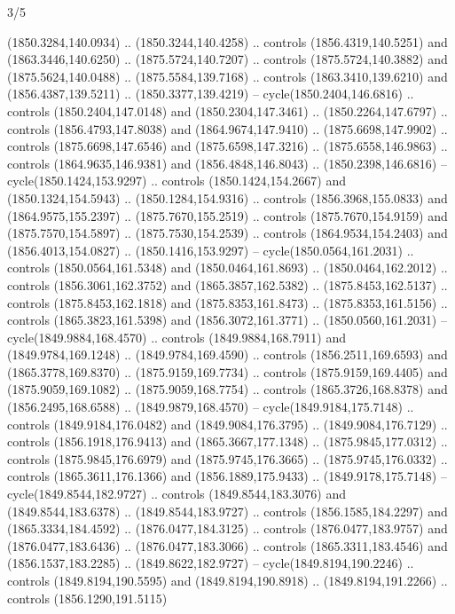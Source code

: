 \begin{flagdescription}{3/5}
\begin{scope}[xshift=0.5\flaglength,yshift=0.5\flagwidth,scale=\flagwidth/99]
\begin{scope}[y=0.8pt, x=0.8pt, yscale=-0.20628, xscale=0.20628,shift={(-500,-300)}]
\begin{scope}[cm={{0.79646,0.0,0.0,0.7753,(100.0721,273.79617)}}]
\begin{scope}[cm={{1.1028,0.0,0.0,1.08434,(-41.46868,-11.26981)}}]
  (1850.3284,140.0934) .. (1850.3244,140.4258) .. controls (1856.4319,140.5251)
  and (1863.3446,140.6250) .. (1875.5724,140.7207) .. controls
  (1875.5724,140.3882) and (1875.5624,140.0488) .. (1875.5584,139.7168) ..
  controls (1863.3410,139.6210) and (1856.4387,139.5211) .. (1850.3377,139.4219)
  -- cycle(1850.2404,146.6816) .. controls (1850.2404,147.0148) and
  (1850.2304,147.3461) .. (1850.2264,147.6797) .. controls (1856.4793,147.8038)
  and (1864.9674,147.9410) .. (1875.6698,147.9902) .. controls
  (1875.6698,147.6546) and (1875.6598,147.3216) .. (1875.6558,146.9863) ..
  controls (1864.9635,146.9381) and (1856.4848,146.8043) .. (1850.2398,146.6816)
  -- cycle(1850.1424,153.9297) .. controls (1850.1424,154.2667) and
  (1850.1324,154.5943) .. (1850.1284,154.9316) .. controls (1856.3968,155.0833)
  and (1864.9575,155.2397) .. (1875.7670,155.2519) .. controls
  (1875.7670,154.9159) and (1875.7570,154.5897) .. (1875.7530,154.2539) ..
  controls (1864.9534,154.2403) and (1856.4013,154.0827) .. (1850.1416,153.9297)
  -- cycle(1850.0564,161.2031) .. controls (1850.0564,161.5348) and
  (1850.0464,161.8693) .. (1850.0464,162.2012) .. controls (1856.3061,162.3752)
  and (1865.3857,162.5382) .. (1875.8453,162.5137) .. controls
  (1875.8453,162.1818) and (1875.8353,161.8473) .. (1875.8353,161.5156) ..
  controls (1865.3823,161.5398) and (1856.3072,161.3771) .. (1850.0560,161.2031)
  -- cycle(1849.9884,168.4570) .. controls (1849.9884,168.7911) and
  (1849.9784,169.1248) .. (1849.9784,169.4590) .. controls (1856.2511,169.6593)
  and (1865.3778,169.8370) .. (1875.9159,169.7734) .. controls
  (1875.9159,169.4405) and (1875.9059,169.1082) .. (1875.9059,168.7754) ..
  controls (1865.3726,168.8378) and (1856.2495,168.6588) .. (1849.9879,168.4570)
  -- cycle(1849.9184,175.7148) .. controls (1849.9184,176.0482) and
  (1849.9084,176.3795) .. (1849.9084,176.7129) .. controls (1856.1918,176.9413)
  and (1865.3667,177.1348) .. (1875.9845,177.0312) .. controls
  (1875.9845,176.6979) and (1875.9745,176.3665) .. (1875.9745,176.0332) ..
  controls (1865.3611,176.1366) and (1856.1889,175.9433) .. (1849.9178,175.7148)
  -- cycle(1849.8544,182.9727) .. controls (1849.8544,183.3076) and
  (1849.8544,183.6378) .. (1849.8544,183.9727) .. controls (1856.1585,184.2297)
  and (1865.3334,184.4592) .. (1876.0477,184.3125) .. controls
  (1876.0477,183.9757) and (1876.0477,183.6436) .. (1876.0477,183.3066) ..
  controls (1865.3311,183.4546) and (1856.1537,183.2285) .. (1849.8622,182.9727)
  -- cycle(1849.8194,190.2246) .. controls (1849.8194,190.5595) and
  (1849.8194,190.8918) .. (1849.8194,191.2266) .. controls (1856.1290,191.5115)

\end{scope}
\end{scope}
\end{scope}
\end{scope}
\end{flagdescription}
